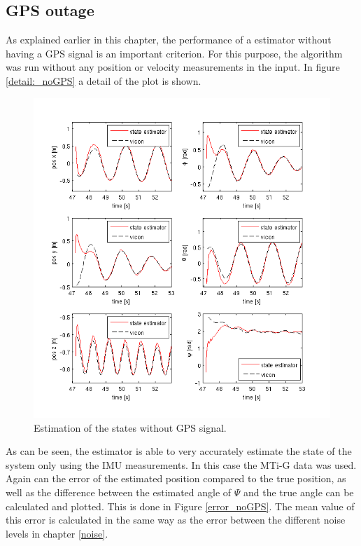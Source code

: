 \subsection{GPS outage}\label{no_GPS}
As explained earlier in this chapter, the performance of a estimator without having a GPS signal is an important criterion. For this purpose, the algorithm was run without any position or velocity measurements in the input. In figure \ref{detail:_noGPS} a detail of the plot is shown.
\begin{figure}[hb]
\centering
\includegraphics[width=1\textwidth]{pictures/2_2_detail_noGPS.png}
\caption{Estimation of the states without GPS signal.}
\label{detail_noGPS}
\end{figure}
As can be seen, the estimator is able to very accurately estimate the state of the system only using the IMU measurements. In this case the MTi-G data was used. Again can the error of the estimated position compared to the true position, as well as the difference between the estimated angle of $\Psi$ and the true angle can be calculated and plotted. This is done in Figure \ref{error_noGPS}. The mean value of this error is calculated in the same way as the error between the different noise levels in chapter \ref{noise}.
